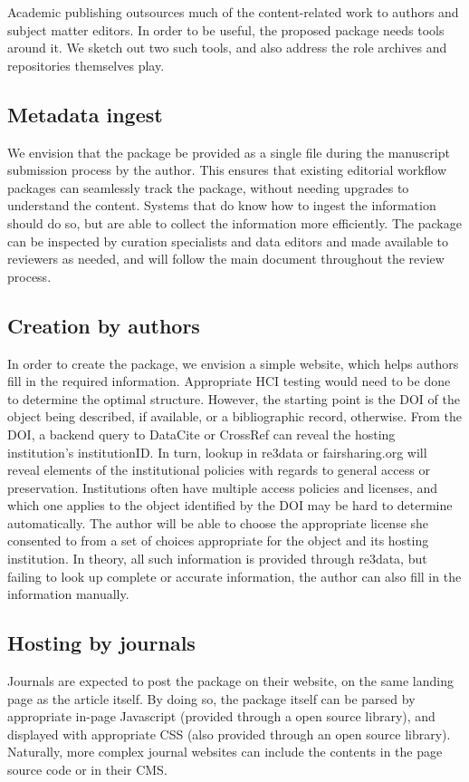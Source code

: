Academic publishing outsources much of the content-related work to authors and subject matter editors. In order to be useful, the proposed package needs tools around it. We sketch out two such tools, and also address the role archives and repositories themselves play. 
\subsection{Metadata ingest}

We envision that the package be provided as a single file during the manuscript submission process by the author. This ensures that existing editorial workflow packages can seamlessly track the package, without needing upgrades to understand the content. Systems that do know how to ingest the information should do so, but are able to collect the information more efficiently. The package can be inspected by curation specialists and data editors and made available to reviewers as needed, and will follow the main document throughout the review process. 
           
\subsection{Creation by authors}
In order to create the package, we envision a simple website, which helps authors fill in the required information. Appropriate \ac{HCI} testing would need to be done to determine the optimal structure. However, the starting point is the DOI of the object being described, if available, or a bibliographic record, otherwise. From the DOI, a backend query to DataCite or CrossRef can reveal the hosting institution's institutionID. In turn, lookup in re3data or fairsharing.org will reveal elements of the institutional policies with regards to general access or preservation. Institutions often have multiple access policies and licenses, and which one applies to the object identified by the DOI may be hard to determine automatically. The author will be able to choose the appropriate license she consented to from a set of choices appropriate for the object and its hosting institution. In theory, all such information is provided through re3data, but failing to look up complete or accurate information, the author can also fill in the information manually. 
           
\subsection{Hosting by journals}
Journals are expected to post the package on their website, on the same landing page as the article itself. By doing so, the package itself can be parsed by appropriate in-page Javascript (provided through a open source library), and displayed with appropriate CSS (also provided through an open source library). Naturally, more complex journal websites can include the contents in the page source code or in their \ac{CMS}. 

